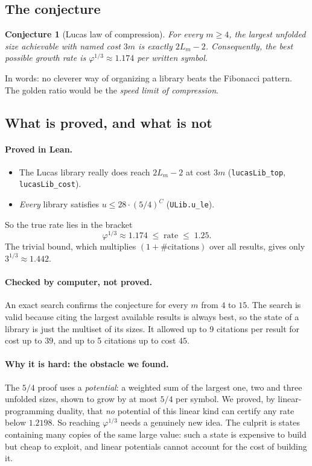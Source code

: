 \documentclass[11pt]{article}
\newtheorem*{conj}{Conjecture}
\newcommand{\lean}[1]{\texttt{#1}}
\begin{document}
\subsection{The conjecture}

\begin{conj}[Lucas law of compression]
For every $m\ge4$, the largest unfolded size achievable with named cost $3m$ is exactly
$2L_m-2$. Consequently, the best possible growth rate is $\varphi^{1/3}\approx1.174$ per
written symbol.
\end{conj}

\noindent In words: no cleverer way of organizing a library beats the Fibonacci pattern.
The golden ratio would be the \emph{speed limit of compression}.

\subsection{What is proved, and what is not}

\paragraph{Proved in Lean.}
\begin{itemize}
\item The Lucas library really does reach $2L_m-2$ at cost $3m$ (\lean{lucasLib\_top},
  \lean{lucasLib\_cost}).
\item \emph{Every} library satisfies $u\le 28\cdot(5/4)^C$ (\lean{ULib.u\_le}).
\end{itemize}
So the true rate lies in the bracket
\[
\varphi^{1/3}\approx 1.174 \;\le\; \text{rate} \;\le\; 1.25.
\]
The trivial bound, which multiplies $(1+\#\text{citations})$ over all results, gives only
$3^{1/3}\approx1.442$.

\paragraph{Checked by computer, not proved.} An exact search confirms the conjecture for
every $m$ from $4$ to $15$. The search is valid because citing the largest available
results is always best, so the state of a library is just the multiset of its sizes. It
allowed up to 9 citations per result for cost up to $39$, and up to 5 citations up to cost
$45$.

\paragraph{Why it is hard: the obstacle we found.} The $5/4$ proof uses a
\emph{potential}: a weighted sum of the largest one, two and three unfolded sizes, shown to
grow by at most $5/4$ per symbol. We proved, by linear-programming duality, that
\emph{no} potential of this linear kind can certify any rate below $1.2198$. So reaching
$\varphi^{1/3}$ needs a genuinely new idea. The culprit is states containing many copies of
the same large value: such a state is expensive to build but cheap to exploit, and linear
potentials cannot account for the cost of building it.
\end{document}

